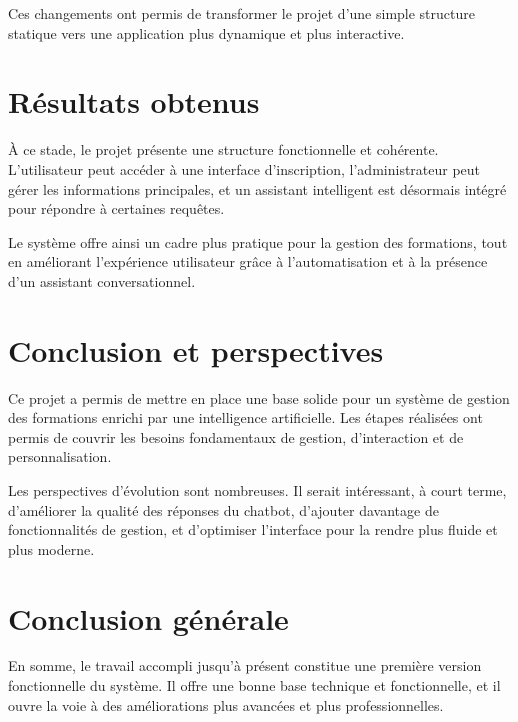 \documentclass[11pt,a4paper]{report}
\begin{document}
Ces changements ont permis de transformer le projet d’une simple structure statique vers une application plus dynamique et plus interactive.

\chapter{Résultats obtenus}
À ce stade, le projet présente une structure fonctionnelle et cohérente. L’utilisateur peut accéder à une interface d’inscription, l’administrateur peut gérer les informations principales, et un assistant intelligent est désormais intégré pour répondre à certaines requêtes.

Le système offre ainsi un cadre plus pratique pour la gestion des formations, tout en améliorant l’expérience utilisateur grâce à l’automatisation et à la présence d’un assistant conversationnel.

\chapter{Conclusion et perspectives}
Ce projet a permis de mettre en place une base solide pour un système de gestion des formations enrichi par une intelligence artificielle. Les étapes réalisées ont permis de couvrir les besoins fondamentaux de gestion, d’interaction et de personnalisation.

Les perspectives d’évolution sont nombreuses. Il serait intéressant, à court terme, d’améliorer la qualité des réponses du chatbot, d’ajouter davantage de fonctionnalités de gestion, et d’optimiser l’interface pour la rendre plus fluide et plus moderne.

\chapter*{Conclusion générale}
En somme, le travail accompli jusqu’à présent constitue une première version fonctionnelle du système. Il offre une bonne base technique et fonctionnelle, et il ouvre la voie à des améliorations plus avancées et plus professionnelles.
\end{document}
